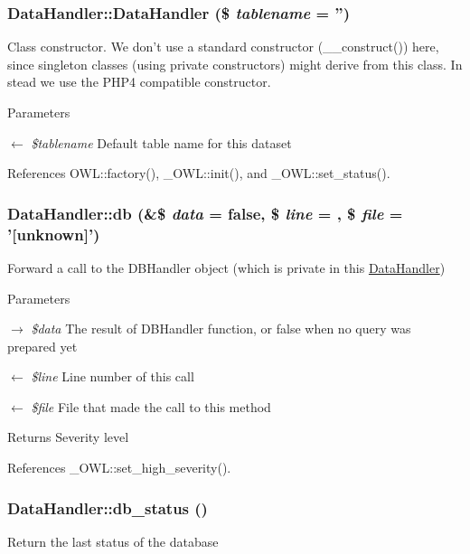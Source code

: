 \subsubsection[{DataHandler}]{\setlength{\rightskip}{0pt plus 5cm}DataHandler::DataHandler (\$ {\em tablename} = {\ttfamily ''})}\label{classDataHandler_aed5b2eb4ca7b2e4b0c1563d817d73c16}
Class constructor. We don't use a standard constructor (\_\-\_\-construct()) here, since singleton classes (using private constructors) might derive from this class. In stead we use the PHP4 compatible constructor. 
\begin{DoxyParams}{Parameters}
\item[\mbox{$\leftarrow$} {\em \$tablename}]Default table name for this dataset \end{DoxyParams}


References OWL::factory(), \_\-OWL::init(), and \_\-OWL::set\_\-status().

\subsubsection[{db}]{\setlength{\rightskip}{0pt plus 5cm}DataHandler::db (\&\$ {\em data} = {\ttfamily false}, \/  \$ {\em line} = {}, \/  \$ {\em file} = {\ttfamily '\mbox{[}unknown\mbox{]}'})}\label{classDataHandler_abb329fe5a97eb8df928aabfc8078ff23}
Forward a call to the DBHandler object (which is private in this \hyperlink{classDataHandler}{DataHandler})


\begin{DoxyParams}{Parameters}
\item[\mbox{$\rightarrow$} {\em \$data}]The result of DBHandler function, or false when no query was prepared yet \item[\mbox{$\leftarrow$} {\em \$line}]Line number of this call \item[\mbox{$\leftarrow$} {\em \$file}]File that made the call to this method \end{DoxyParams}
\begin{DoxyReturn}{Returns}
Severity level 
\end{DoxyReturn}


References \_\-OWL::set\_\-high\_\-severity().

\subsubsection[{db\_\-status}]{\setlength{\rightskip}{0pt plus 5cm}DataHandler::db\_\-status ()}\label{classDataHandler_a3c82ec0a40dabcc55dc203c96abf02d2}
Return the last status of the database

